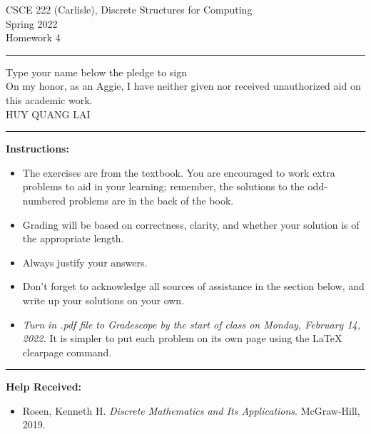 \documentclass[12pt]{article}  %
\begin{document}
\begin{center}         %
{\large                %
CSCE 222 (Carlisle), Discrete Structures for Computing \\  %
Spring 2022 \\
Homework 4}
\end{center}
\rule{6in}{.1pt}       %
\begin{center}
{\large
Type your name below the pledge to sign\\
On my honor, as an Aggie, I have neither given nor received unauthorized aid on this academic work.\\
HUY QUANG LAI}
\end{center}


\rule{6in}{.1pt}       %
                    
\noindent              %
{\bf Instructions:}    %

\begin{itemize}        %
\item The exercises are from the textbook.  You are encouraged to work
      extra problems to aid in your learning; remember, the solutions to 
      the odd-numbered problems are in the back of the book.
\item Grading will be based on correctness, clarity, and whether your
      solution is of the appropriate length.
\item Always justify your answers.
\item Don't forget to acknowledge all sources of assistance in the section below, and write up your solutions on your own.
\item {\em Turn in .pdf file to Gradescope by the start of class on Monday, February 14, 2022.}  It is simpler to put each problem on its own page using the LaTeX clearpage command.
\end{itemize}


\rule{6in}{.1pt}       %

{\bf Help Received:}    %
\begin{itemize}
\item Rosen, Kenneth H. \emph{Discrete Mathematics and Its Applications}. McGraw-Hill, 2019. 
\end{itemize}
\end{document}
